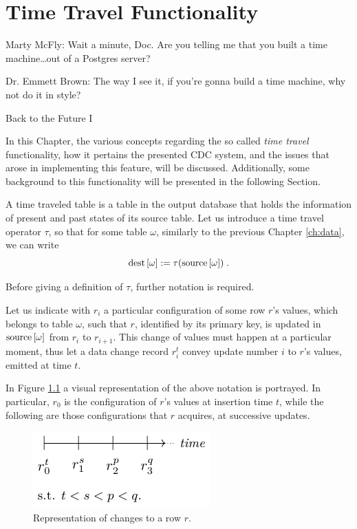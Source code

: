 \chapter{Time Travel Functionality}
\label{ch:timetravel}

\epigraph{%
    Marty McFly: Wait a minute, Doc. Are you telling me that you built a time machine\ldots out of a Postgres server?
	
    Dr. Emmett Brown: The way I see it, if you're gonna build a time machine, why not do it in style?
}{Back to the Future I}

In this Chapter, the various concepts regarding the so called \emph{time travel} functionality, how it pertains the presented CDC system, and the issues that arose in implementing this feature, will be discussed.
Additionally, some background to this functionality will be presented in the following Section.

A time traveled table is a table in the output database that holds the information of present and past states of its source table.
Let us introduce a time travel operator $\tau$, so that for some table $\omega$, similarly to the previous Chapter \ref{ch:data}, we can write
$$
\text{dest}\left[{\omega}\right] := \tau(\text{source}\left[{\omega}\right]) \; .
$$

Before giving a definition of $\tau$, further notation is required.

Let us indicate with $r_i$ a particular configuration of some row $r$'s values, which belongs to table $\omega$, such that $r$, identified by its primary key, is updated in $\text{source}\left[{\omega}\right]$ from $r_i$ to $r_{i + 1}$.
This change of values must happen at a particular moment, thus let a data change record $r_i^t$ convey update number $i$ to $r$'s values, emitted at time $t$.

In Figure \ref{fig:tt-intro} a visual representation of the above notation is portrayed.
In particular, $r_0$ is the configuration of $r$'s values at insertion time $t$, while the following are those configurations that $r$ acquires, at successive updates.

\begin{figure}
	\centering
	\includegraphics[width=0.4\linewidth]{figures/time-travel/intro}
	\caption{Representation of changes to a row $r$.}
	\label{fig:tt-intro}
\end{figure}

